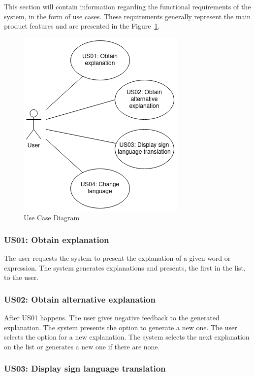 This section will contain information regarding the functional requirements of the system, in the form of use cases.
These requirements generally represent the main product features and are presented in the Figure~\ref{fig:ucDiagram}.

\begin{figure}[H]
\centering
\includegraphics[scale=0.65]{ch4/assets/usecasediagram.png}
\caption[Use Case Diagram]{Use Case Diagram}
\label{fig:ucDiagram}
\end{figure}

\subsubsection{US01: Obtain explanation}

The user requests the system to present the explanation of a given word or expression.
The system generates explanations and presents, the first in the list, to the user.

\subsubsection{US02: Obtain alternative explanation}

After US01 happens.
The user gives negative feedback to the generated explanation.
The system presents the option to generate a new one.
The user selects the option for a new explanation.
The system selects the next explanation on the list or generates a new one if there are none.

\subsubsection{US03: Display sign language translation}


